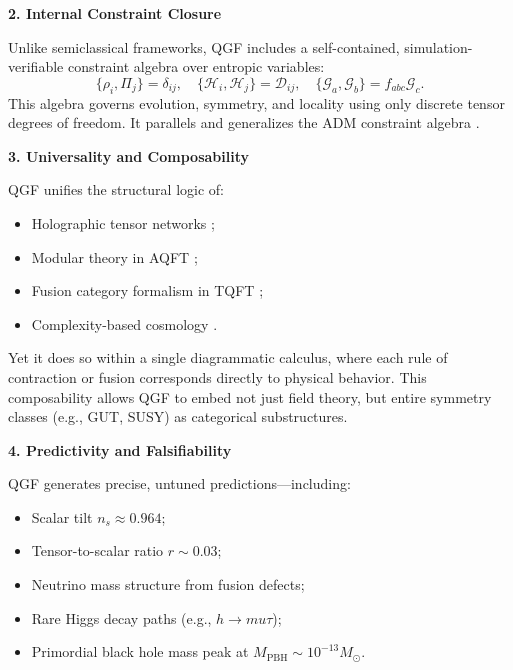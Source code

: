 \documentclass[11pt]{article}
\def\mu{mu}
\begin{document}
\vspace{0.5em}
\noindent\textbf{2. Internal Constraint Closure}

Unlike semiclassical frameworks, QGF includes a self-contained, simulation-verifiable constraint algebra over entropic variables:
\[
\{\rho_i, \Pi_j\} = \delta_{ij}, \quad \{\mathcal{H}_i, \mathcal{H}_j\} = \mathcal{D}_{ij}, \quad \{\mathcal{G}_a, \mathcal{G}_b\} = f_{abc} \mathcal{G}_c.
\]
This algebra governs evolution, symmetry, and locality using only discrete tensor degrees of freedom. It parallels and generalizes the ADM constraint algebra \cite{Arnowitt2008}.

\vspace{0.5em}
\noindent\textbf{3. Universality and Composability}

QGF unifies the structural logic of:

\begin{itemize}
  \item Holographic tensor networks \cite{Swingle2012};
  \item Modular theory in AQFT \cite{Haag1996, Bisognano1976};
  \item Fusion category formalism in TQFT \cite{Fuchs2002, Ostrik2002};
  \item Complexity-based cosmology \cite{Haegeman2013}.
\end{itemize}

Yet it does so within a single diagrammatic calculus, where each rule of contraction or fusion corresponds directly to physical behavior. This composability allows QGF to embed not just field theory, but entire symmetry classes (e.g., GUT, SUSY) as categorical substructures.

\vspace{0.5em}
\noindent\textbf{4. Predictivity and Falsifiability}

QGF generates precise, untuned predictions—including:
\begin{itemize}
  \item Scalar tilt \( n_s \approx 0.964 \);
  \item Tensor-to-scalar ratio \( r \sim 0.03 \);
  \item Neutrino mass structure from fusion defects;
  \item Rare Higgs decay paths (e.g., \( h \rightarrow \mu\tau \));
  \item Primordial black hole mass peak at \( M_{\text{PBH}} \sim 10^{-13} M_\odot \).
\end{itemize}
\end{document}
